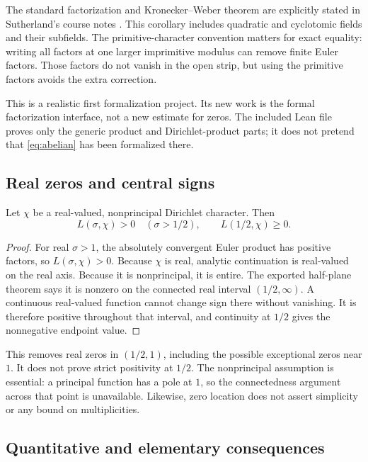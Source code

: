 The standard factorization and Kronecker--Weber theorem are explicitly stated in Sutherland's course notes \cite{kronecker}. This corollary includes quadratic and cyclotomic fields and their subfields. The primitive-character convention matters for exact equality: writing all factors at one larger imprimitive modulus can remove finite Euler factors. Those factors do not vanish in the open strip, but using the primitive factors avoids the extra correction.

This is a realistic first formalization project. Its new work is the formal factorization interface, not a new estimate for zeros. The included Lean file proves only the generic product and Dirichlet-product parts; it does not pretend that \eqref{eq:abelian} has been formalized there.

\subsection{Real zeros and central signs}

\begin{proposition}\label{prop:positive}
Let \(\chi\) be a real-valued, nonprincipal Dirichlet character. Then
\[
L(\sigma,\chi)>0\quad(\sigma>1/2),
\qquad
L(1/2,\chi)\ge0.
\]
\end{proposition}

\begin{proof}
For real \(\sigma>1\), the absolutely convergent Euler product has positive factors, so \(L(\sigma,\chi)>0\). Because \(\chi\) is real, analytic continuation is real-valued on the real axis. Because it is nonprincipal, it is entire. The exported half-plane theorem says it is nonzero on the connected real interval \((1/2,\infty)\). A continuous real-valued function cannot change sign there without vanishing. It is therefore positive throughout that interval, and continuity at \(1/2\) gives the nonnegative endpoint value.
\end{proof}

This removes real zeros in \((1/2,1)\), including the possible exceptional zeros near \(1\). It does not prove strict positivity at \(1/2\). The nonprincipal assumption is essential: a principal function has a pole at \(1\), so the connectedness argument across that point is unavailable. Likewise, zero location does not assert simplicity or any bound on multiplicities.

\subsection{Quantitative and elementary consequences}


